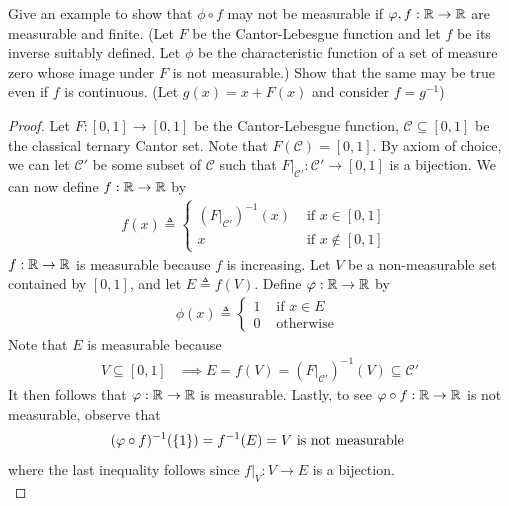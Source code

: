 \documentclass{report}
\begin{document}
\begin{question}{}{}
Give an example to show that $\phi \circ f$ may not be measurable if $\varphi,f:\mathbb{R}\rightarrow \mathbb{R}$ are measurable and finite. (Let $F$ be the Cantor-Lebesgue function and let  $f$ be its inverse suitably defined. Let $\phi$ be the characteristic function of a set of measure zero whose image under $F$ is not measurable.) Show that the same may be true even if $f$ is continuous. (Let $g(x)=x+F(x)$ and consider $f=g^{-1}$) 
\end{question}
\begin{proof}
  Let $F:[0,1]\rightarrow [0,1]$ be the Cantor-Lebesgue function, $\mathcal{C}\subseteq [0,1]$ be the classical ternary Cantor set. Note that $F(\mathcal{C})=[0,1]$. By axiom of choice, we can let $\mathcal{C}'$ be some subset of $\mathcal{C}$ such that $F|_{\mathcal{C}'}:\mathcal{C}'\rightarrow [0,1]$ is a bijection. We can now define $f:\mathbb{R}\rightarrow \mathbb{R}$ by
\begin{align*}
f(x)\triangleq \begin{cases}
  (F|_{\mathcal{C}'})^{-1}(x)& \text{ if $x\in [0,1]$ } \\
  x& \text{ if $x\not\in [0,1]$ }
\end{cases}  
\end{align*}
$f:\mathbb{R}\rightarrow \mathbb{R}$ is measurable because $f$ is increasing. Let $V$ be a non-measurable set contained by  $[0,1]$, and let $E\triangleq f(V)$. Define $\varphi:\mathbb{R}\rightarrow \mathbb{R}$ by 
\begin{align*}
\phi(x)\triangleq \begin{cases}
  1& \text{ if $x \in E$ }\\
  0& \text{ otherwise }
\end{cases}
\end{align*}
Note that $E$ is measurable because
 \begin{align*}
   V\subseteq [0,1]&\implies E=f(V)= (F|_{\mathcal{C}'})^{-1}(V)\subseteq \mathcal{C}' 
\end{align*}
It then follows that $\varphi:\mathbb{R}\rightarrow \mathbb{R}$ is measurable. Lastly, to see $\varphi \circ f:\mathbb{R}\rightarrow \mathbb{R}$ is not measurable, observe that 
\begin{align*}
  (\varphi \circ f)^{-1}(\{ 1 \})=f^{-1}(E)=V\text{ is not measurable }
\end{align*}
where the last inequality follows since $f|_{V}: V\rightarrow E$ is a bijection. \\


\end{proof}
\end{document}

